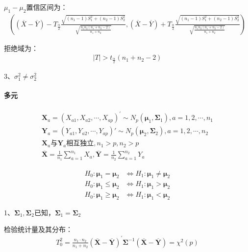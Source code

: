 \documentclass[12pt]{book}
\begin{document}
$\mu_1-\mu_2$置信区间为：
\begin{gather*}
    \left(
(\overline{X}-\overline{Y})-T_{\frac{\alpha}{2}}\frac{ \sqrt{(n_1-1)S_1^2+(n_2-1)S_2^2} }{ \sqrt{ \frac{ n_1 n_2 (n_1+n_2 -2) }{ n_1+n_2 } } } ,
(\overline{X}-\overline{Y})+T_{\frac{\alpha}{2}}\frac{ \sqrt{(n_1-1)S_1^2+(n_2-1)S_2^2} }{ \sqrt{ \frac{ n_1 n_2 (n_1+n_2 -2) }{ n_1+n_2 } } }
    \right)
\end{gather*}

拒绝域为：
\begin{gather*}
    \left|T\right|>t_{\frac{\alpha}{2}}(n_1+n_2-2)
\end{gather*}


3、$\sigma_1^2\neq\sigma_2^2$











\paragraph{多元}


\begin{gather*}
    \mathbf{X}_{a}=(X_{a1},X_{a2},\cdots,X_{ap})^\prime \sim N_p(\bm{\mu}_1,\bm{\Sigma}_1), a=1,2,\cdots,n_1\\
    \bm{Y}_a=\left(Y_{a1},Y_{a2},\cdots,Y_{ap}\right)' \sim N_p(\bm{\mu}_2,\mathbf{\Sigma}_2), a=1,2,\cdots,n_2 \\
    \mathbf{X}_{a}与\mathbf{Y}_a\text{相互独立}, n_1>p, n_2>p\\
    \overline{\bm{X}}=\frac{1}{n_1}\sum_{a=1}^{n_1}{X_a}, \overline{\bm{Y}}=\frac{1}{n_2}\sum_{a=1}^{n_2}{Y_a}
\end{gather*}



\begin{align*}
    H_0:\bm{\mu}_1=\bm{\mu}_2    & \Leftrightarrow H_1:\bm{\mu}_1\neq\bm{\mu}_2 \\
    H_0:\bm{\mu}_1\le\bm{\mu}_2  & \Leftrightarrow  H_1:\bm{\mu}_1>\bm{\mu}_2   \\
    H_0:\bm{\mu}_1\geq\bm{\mu}_2 & \Leftrightarrow H_1:\bm{\mu}_1<\bm{\mu}_2
\end{align*}


1、$\bm{\Sigma}_1,\bm{\Sigma}_2$已知，$\bm{\Sigma}_1=\bm{\Sigma}_2$

检验统计量及其分布：
\begin{gather*}
    T_0^2 =\frac{n_1\cdot n_2}{n_1+n_2}\left(\overline{\bm{X}}-\overline{\bm{Y}}\right)^\prime\bm{\Sigma}^{-1}\left(\overline{\bm{X}}-\overline{\bm{Y}}\right)=\chi^2\left(p\right)
\end{gather*}
\end{document}
